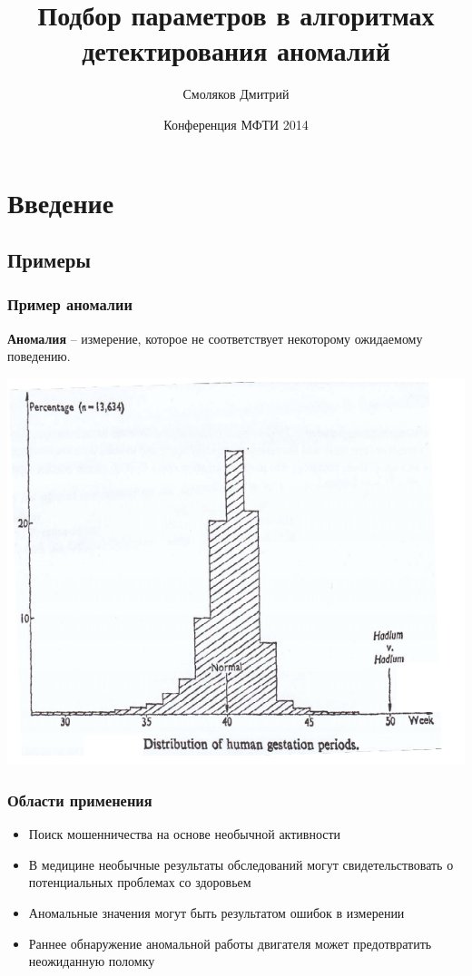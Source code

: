 \documentclass[10pt,pdf]{beamer}
\title[Ядерные методы в детектировании аномалий\hspace{8mm} \insertframenumber/\inserttotalframenumber]{Подбор параметров в алгоритмах детектирования аномалий}
\author{Смоляков Дмитрий}
\institute{МФТИ, ИППИ РАН}
\date{Конференция МФТИ 2014}
\begin{document}
\maketitle

\section{Введение}
\subsection{Примеры}
\begin{frame}\frametitle{Пример аномалии}
\textbf{Аномалия} -- измерение, которое не соответствует некоторому ожидаемому поведению.
\begin{center}
\includegraphics[scale=0.3]{Haldum}
\end{center}
\end{frame}


\begin{frame}\frametitle{Области применения}
\begin{itemize}
\item Поиск мошенничества на основе необычной активности
\item В медицине необычные результаты обследований могут свидетельствовать о потенциальных проблемах со здоровьем
\item Аномальные значения могут быть результатом ошибок в измерении
\item Раннее обнаружение аномальной работы двигателя может предотвратить неожиданную поломку
\end{itemize}
\end{frame}
\end{document}
